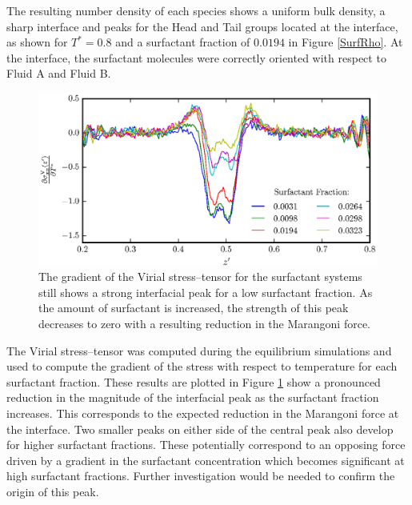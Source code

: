 The resulting number density of each species shows a uniform bulk density, a sharp interface and peaks for the Head and Tail groups located at the interface, as shown for $T^{*}=0.8$ and a surfactant fraction of $0.0194$ in Figure \ref{SurfRho}.
At the interface, the surfactant molecules were correctly oriented with respect to Fluid A and Fluid B.
\FloatBarrier

\begin{figure}[h]
\centering
\includegraphics[scale=0.8]{SurfForce}
\caption{The gradient of the Virial stress--tensor for the surfactant systems still shows a strong interfacial peak for a low surfactant fraction.
As the amount of surfactant is increased, the strength of this peak decreases to zero with a resulting reduction in the Marangoni force.
}
\label{SurfForce}
\end{figure}

The Virial stress--tensor was computed during the equilibrium simulations and used to compute the gradient of the stress with respect to temperature for each surfactant fraction.
These results are plotted in Figure \ref{SurfForce} show a pronounced reduction in the magnitude of the interfacial peak as the surfactant fraction increases.
This corresponds to the expected reduction in the Marangoni force at the interface.
Two smaller peaks on either side of the central peak also develop for higher surfactant fractions.
These potentially correspond to an opposing force driven by a gradient in the surfactant concentration which becomes significant at high surfactant fractions.
Further investigation would be needed to confirm the origin of this peak.
\FloatBarrier

